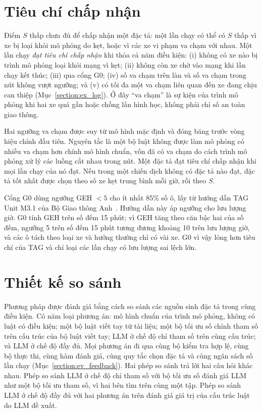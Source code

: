 \documentclass[../main.tex]{subfiles}
\begin{document}
\section{Tiêu chí chấp nhận}
\label{section:ev_eligibility}

Điểm $S$ thấp chưa đủ để chấp nhận một đặc tả: một lần chạy có thể có $S$ thấp vì xe bị loại khỏi mô phỏng do kẹt, hoặc vì các xe vi phạm va chạm với nhau. Một lần chạy \emph{đạt tiêu chí chấp nhận} khi thỏa cả năm điều kiện: (i) không có xe nào bị trình mô phỏng loại khỏi mạng vì kẹt; (ii) không còn xe chờ vào mạng khi lần chạy kết thúc; (iii) qua cổng G0; (iv) số va chạm trên làn và số va chạm trong nút không vượt ngưỡng; và (v) có tối đa một va chạm liên quan đến xe đang chịu can thiệp (Mục~\ref{section:ex_log}). Ở đây ``va chạm'' là sự kiện của trình mô phỏng khi hai xe quá gần hoặc chồng lấn hình học, không phải chỉ số an toàn giao thông.

Hai ngưỡng va chạm được suy từ mô hình mặc định và đóng băng trước vòng hiệu chỉnh đầu tiên. Nguyên tắc là một bộ luật không được làm mô phỏng có nhiều va chạm hơn chính mô hình chuẩn, vốn đã có va chạm do cách trình mô phỏng xử lý các luồng cắt nhau trong nút. Một đặc tả đạt tiêu chí chấp nhận khi mọi lần chạy của nó đạt. Nếu trong một chiến dịch không có đặc tả nào đạt, đặc tả tốt nhất được chọn theo số xe kẹt trung bình mỗi giờ, rồi theo $S$.

Cổng G0 dùng ngưỡng GEH $<5$ cho ít nhất 85\% số ô, lấy từ hướng dẫn TAG Unit M3.1 của Bộ Giao thông Anh~\cite{dft2026tagm31}. Hướng dẫn này áp ngưỡng cho lưu lượng giờ. G0 tính GEH trên số đếm 15 phút; vì GEH tăng theo căn bậc hai của số đếm, ngưỡng 5 trên số đếm 15 phút tương đương khoảng 10 trên lưu lượng giờ, và các ô tách theo loại xe và hướng thường chỉ có vài xe. G0 vì vậy lỏng hơn tiêu chí của TAG và chỉ loại các lần chạy có lưu lượng sai lệch lớn.

\section{Thiết kế so sánh}
\label{section:3.8}

Phương pháp được đánh giá bằng cách so sánh các nguồn sinh đặc tả trong cùng điều kiện. Có năm loại phương án: mô hình chuẩn của trình mô phỏng, không có luật có điều kiện; một bộ luật viết tay từ tài liệu; một bộ tối ưu số chỉnh tham số trên cấu trúc của bộ luật viết tay; LLM ở chế độ chỉ tham số trên cùng cấu trúc; và LLM ở chế độ đầy đủ. Mọi phương án đi qua cùng bộ kiểm tra hợp lệ, cùng bộ thực thi, cùng hàm đánh giá, cùng quy tắc chọn đặc tả và cùng ngân sách số lần chạy (Mục~\ref{section:ev_feedback}). Hai phép so sánh trả lời hai câu hỏi khác nhau. Phép so sánh LLM ở chế độ chỉ tham số với bộ tối ưu số đánh giá LLM như một bộ tối ưu tham số, vì hai bên tìm trên cùng một tập. Phép so sánh LLM ở chế độ đầy đủ với hai phương án trên đánh giá giá trị của cấu trúc luật do LLM đề xuất.
\end{document}
